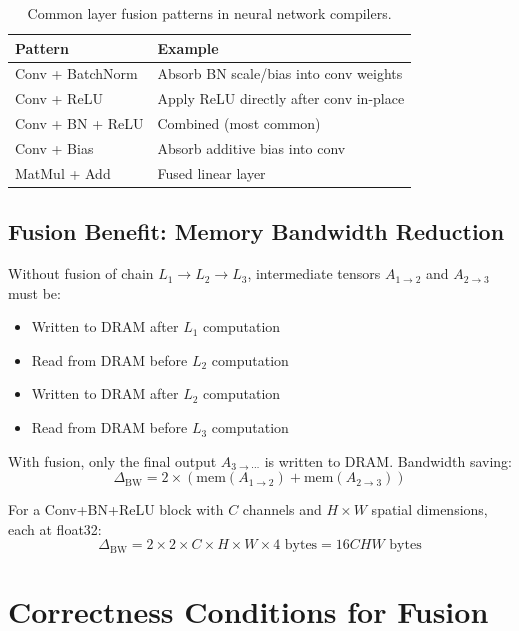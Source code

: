 \documentclass[12pt]{article}
\theoremstyle{definition}
\begin{document}
\begin{table}[h!]
\centering
\begin{tabular}{|l|l|}
\hline
\textbf{Pattern} & \textbf{Example} \\
\hline
Conv + BatchNorm & Absorb BN scale/bias into conv weights \\
Conv + ReLU & Apply ReLU directly after conv in-place \\
Conv + BN + ReLU & Combined (most common) \\
Conv + Bias & Absorb additive bias into conv \\
MatMul + Add & Fused linear layer \\
\hline
\end{tabular}
\caption{Common layer fusion patterns in neural network compilers.}
\end{table}

\subsection{Fusion Benefit: Memory Bandwidth Reduction}

Without fusion of chain $L_1 \to L_2 \to L_3$, intermediate tensors $A_{1\to2}$ and $A_{2\to3}$ must be:
\begin{itemize}
  \item Written to DRAM after $L_1$ computation
  \item Read from DRAM before $L_2$ computation
  \item Written to DRAM after $L_2$ computation
  \item Read from DRAM before $L_3$ computation
\end{itemize}

With fusion, only the final output $A_{3\to\cdots}$ is written to DRAM. Bandwidth saving:
\begin{equation}
\Delta_{\text{BW}} = 2 \times (\text{mem}(A_{1\to2}) + \text{mem}(A_{2\to3}))
\end{equation}

For a Conv+BN+ReLU block with $C$ channels and $H \times W$ spatial dimensions, each at float32:
\begin{equation}
\Delta_{\text{BW}} = 2 \times 2 \times C \times H \times W \times 4 \text{ bytes} = 16 CHW \text{ bytes}
\end{equation}

\section{Correctness Conditions for Fusion}
\end{document}
